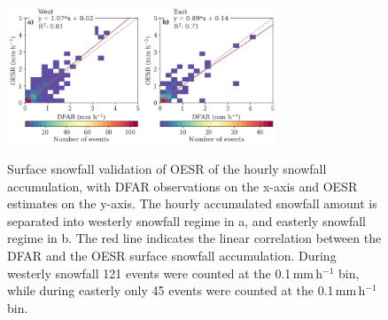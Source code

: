 \documentclass{ametsocV5}
\begin{document}
\begin{figure}
    \noindent\includegraphics[width=19pc,angle=0]{fig8.png}\\
    \caption{Surface snowfall validation of OESR of the hourly snowfall accumulation, with DFAR observations on the x-axis and OESR estimates on the y-axis. The hourly accumulated snowfall amount is separated into westerly snowfall regime in a, and easterly snowfall regime in b. The red line indicates the linear correlation between the DFAR and the OESR surface snowfall accumulation. During westerly snowfall 121 events were counted at the 0.1\,mm\,h$^{-1}$ bin, while during easterly only 45 events were counted at the 0.1\,mm\,h$^{-1}$ bin.
}
    \label{fig:sfc_oesr}
\end{figure}
\end{document}

